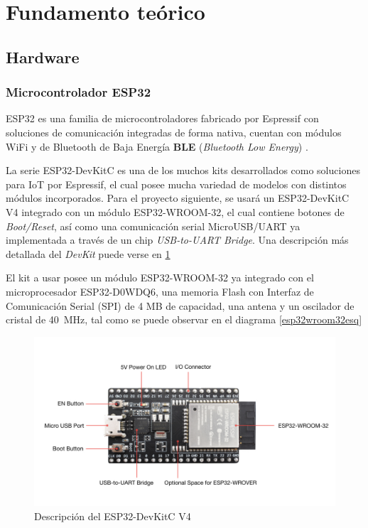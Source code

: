 \documentclass[../main]{subfiles}
\begin{document}
\section{Fundamento teórico}

\subsection{Hardware}

\subsubsection{Microcontrolador ESP32}

ESP32 es una familia de microcontroladores fabricado por Espressif con
soluciones de comunicación integradas de forma nativa, cuentan con módulos WiFi
y de Bluetooth de Baja Energía \textbf{BLE} (\textit{Bluetooth Low Energy})
\cite{ESP32_espressif}.

La serie ESP32-DevKitC es una de los muchos kits desarrollados como soluciones
para IoT por Espressif, el cual posee mucha variedad de modelos con distintos
módulos incorporados.
Para el proyecto siguiente, se usará un ESP32-DevKitC V4 integrado con un módulo
ESP32-WROOM-32, el cual contiene botones de \textit{Boot/Reset}, así como una
comunicación serial MicroUSB/UART ya implementada a través de un chip
\textit{USB-to-UART Bridge}\cite{devkitv4}.
Una descripción más detallada del \textit{DevKit} puede verse en
\ref{esp32devkitcv4image}

El kit a usar posee un módulo ESP32-WROOM-32 ya integrado con el microprocesador
ESP32-D0WDQ6{}, una memoria Flash con Interfaz de Comunicación Serial (SPI)
de 4 MB de capacidad, una antena y un oscilador de cristal de \qty{40}{\MHz}\cite{esp32wroom32doc}, tal como se puede observar en el diagrama
\ref{esp32wroom32esq}

\begin{figure}[H]
	\centering
	\includegraphics[width=\textwidth]{res/esp32-devkitc-v4-functional-overview.jpg}
	\caption{Descripción del ESP32-DevKitC V4 \cite{devkitv4}}
	\label{esp32devkitcv4image}
\end{figure}
\end{document}
